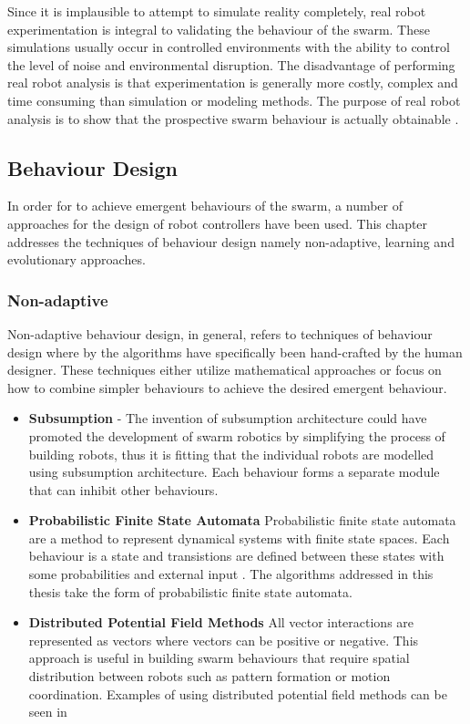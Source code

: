 Since it is implausible to attempt to simulate reality completely, real robot experimentation is integral to validating the behaviour of the swarm. These simulations usually occur in controlled environments with the ability to control the level of noise and environmental disruption. 
The disadvantage of performing real robot analysis is that experimentation is generally more costly, complex and time consuming than simulation or modeling methods. The purpose of real robot analysis is to show that the prospective swarm behaviour is actually obtainable \cite{brambilla2013swarm}.

\subsection{Behaviour Design}

In order for to achieve emergent behaviours of the swarm, a number of approaches for the design of robot controllers have been used. This chapter addresses the techniques of behaviour design namely non-adaptive, learning and evolutionary approaches.

\subsubsection{Non-adaptive}
Non-adaptive behaviour design, in general, refers to techniques of behaviour design where by the algorithms have specifically been hand-crafted by the human designer. These techniques either utilize mathematical approaches or focus on how to combine simpler behaviours to achieve the desired emergent behaviour. 

\begin{itemize}
	\item \textbf{Subsumption} - The invention of subsumption architecture could have promoted the development of swarm robotics by simplifying the process of building robots, thus it is fitting that the individual robots are modelled using subsumption architecture. Each behaviour forms a separate module that can inhibit other behaviours. 
	
	\item \textbf{Probabilistic Finite State Automata} Probabilistic finite state automata are a method to represent dynamical systems with finite state spaces. Each behaviour is a state and transistions are defined between these states with some probabilities and external input \cite{soysal2005probabilistic,labella2004efficiency}. The algorithms addressed in this thesis take the form of probabilistic finite state automata.  
	
	\item \textbf{Distributed Potential Field Methods}
	All vector interactions are represented as vectors where vectors can be positive or negative. This approach is useful in building swarm behaviours that require spatial distribution between robots such as pattern formation or motion coordination. Examples of using distributed potential field methods can be seen in \cite{bennet2010distributed,barnes2007unmanned, kim2006decentralized}  
\end{itemize}

